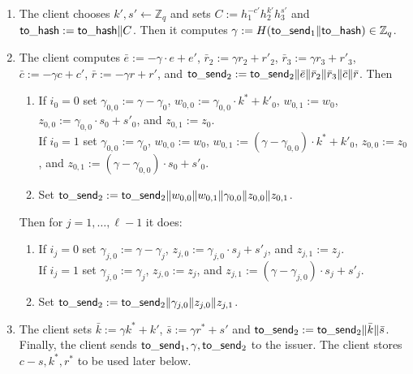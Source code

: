 \documentclass[11pt]{article}
\def\send{{\sf to}\mbox{\_}{\sf send}}
\def\hash{{\sf to}\mbox{\_}{\sf hash}}
\def\Z{{\mathbb Z}}
\def\Z{{\mathbb Z}}
\begin{document}
\begin{itemize}
\begin{enumerate}
    \item The client chooses $k', s'\leftarrow \Z_q$ and sets $C:=h_1^{-c'}h_2^{k'} h_3^{s'}$ and $\hash:=\hash\|C$. Then it computes $\gamma := H(\send_1\|\hash) \in \Z_q$.
        \item The client computes $\bar e := -\gamma \cdot e + e'$, $\bar r_2 := \gamma r_2 + r'_2$, $\bar r_3:=\gamma r_3 + r'_3$, $\bar c:=-\gamma c+c'$, $\bar r:=-\gamma r + r'$, and $\send_2:=\send_2\|\bar e\| \bar r_2 \| \bar r_3 \| \bar c \| \bar r$. 
        Then
  \begin{enumerate}
    \item If $i_0=0$ set $\gamma_{0,0}:=\gamma-\gamma_0$, $w_{0,0}:=\gamma_{0,0} \cdot k^*+k'_0$, 
    $w_{0,1}:=w_0$,
    $z_{0,0}:=\gamma_{0,0}\cdot s_0+s'_0$, and $z_{0,1}:=z_0$.\\
    If $i_0=1$ set $\gamma_{0,0}:=\gamma_0$, $w_{0,0}:=w_0$, $w_{0,1}:= (\gamma-\gamma_{0,0}) \cdot k^*+k'_0$,
    $z_{0,0}:=z_0$, and $z_{0,1}:=(\gamma-\gamma_{0,0}) \cdot s_0+s'_0$. 
    \item Set $\send_2:=\send_2\|w_{0,0}\|w_{0,1}\|\gamma_{0,0}\|z_{0,0}\|z_{0,1}$.
\end{enumerate}      
        Then for $j=1, \ldots, \ell-1$ it does:
\begin{enumerate}
    \item If $i_j=0$ set $\gamma_{j,0}:=\gamma-\gamma_j$, $z_{j,0}:=\gamma_{j,0}\cdot s_j+s'_j$, and $z_{j,1}:=z_j$.\\
    If $i_j=1$ set $\gamma_{j,0}:=\gamma_j$, %
    $z_{j,0}:=z_j$, and $z_{j,1}:=(\gamma-\gamma_{j,0}) \cdot s_j+s'_j$. 
    \item Set $\send_2:=\send_2\|\gamma_{j,0}\|z_{j,0}\|z_{j,1}$.
\end{enumerate}
\item The client sets $\bar k:= \gamma k^* + k'$, $\bar s := \gamma r^* + s'$ and $\send_2:=\send_2\|\bar k\|\bar s$.
Finally, the client sends $\send_1, \gamma, \send_2$ to the issuer.
The client stores $c-s, k^*, r^*$ to be used later below.



\end{enumerate}
\end{itemize}
\end{document}

